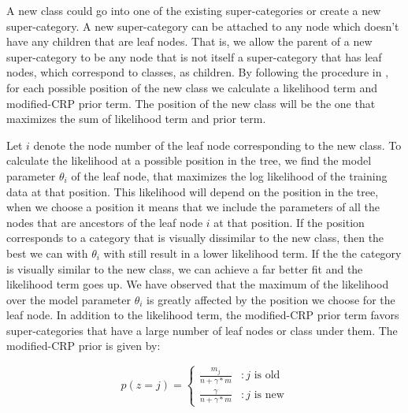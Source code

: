\documentclass[10pt,twocolumn,letterpaper]{article}
\begin{document}
A new class could go into one of the existing super-categories or create a new super-category. A new super-category 
can be attached to any node which doesn't have any children that are leaf nodes. That is, we allow the parent of a new
super-category to be any node that is not itself a super-category that has leaf nodes, which correspond to classes, as children.
By following the procedure in \cite{ruslan},  for each possible position of the new class we calculate a likelihood term and 
modified-CRP prior term. The position of the new class will be the one that maximizes the sum of likelihood term and  prior term. 

Let $i$ denote the node number of the leaf node corresponding to the new class.   
To calculate the likelihood at a possible position in the tree, we find the model parameter $\theta_{i}$ of the leaf node, 
that maximizes the log likelihood of the training data at that position. This likelihood will depend on the position in the tree, when 
we choose a position it means that we include the parameters of all the nodes that are ancestors of the leaf node $i$ at that position. 
If the position corresponds to a category that is visually dissimilar to the new class, then the best we can with $\theta_{i}$ with still 
result in a lower likelihood term. If the the category is visually similar to the new class, we can achieve a far better fit and the likelihood
term goes up. We have observed that the maximum of the likelihood over the model parameter $\theta_{i}$ is greatly affected by the position
 we choose for the leaf node. In addition to the likelihood term, the modified-CRP prior term favors super-categories that have a large number of 
 leaf nodes or class under them. The modified-CRP prior is given by:
 
 \begin{displaymath}
 p(z=j) = \left \{
	    \begin{array}{lr}
 		\frac{m_{j}}{n+\gamma*m} & : \text{$j$ is old} \\
		\frac{\gamma}{n+\gamma*m} & : \text{$j$ is new}
	   \end{array}
	  \right.
 \end{displaymath} 
 
\end{document}
